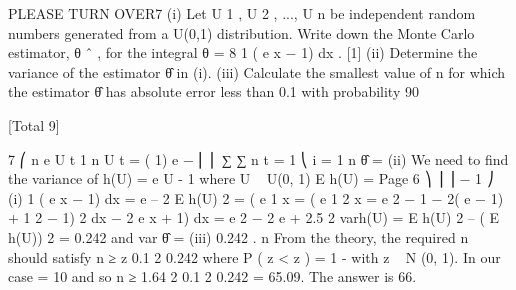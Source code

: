 \documentclass[a4paper,12pt]{article}
\begin{document}
PLEASE TURN OVER7
(i)
Let U 1 , U 2 , ..., U n be independent random numbers generated from a U(0,1)
distribution. Write down the Monte Carlo estimator, θ ˆ , for the integral
θ =
8
1
 ( e
x
− 1) dx .
[1]
(ii) Determine the variance of the estimator θ̂ in (i).
(iii) Calculate the smallest value of n for which the estimator θ̂ has absolute error
less than 0.1 with probability 90%

[Total 9]


7
⎛ n e U t
1 n U t
=
(
1)
e
−
⎜ ⎜ ∑
∑
n t = 1
⎝ i = 1 n
θ̂ =
(ii) We need to find the variance of h(U) = e U - 1 where U ~ U(0, 1)
E h(U) =
Page 6
⎞
⎟ ⎟ − 1
⎠
(i)
1
 ( e
x
− 1) dx = e – 2
E h(U) 2 =  ( e
1
x
=  ( e
1
2 x
= e 2 − 1
− 2( e − 1) + 1
2
− 1) 2 dx
− 2 e x + 1) dx%
=
e 2
− 2 e + 2.5
2
varh(U) = E h(U) 2 – ( E h(U)) 2 = 0.242 and var θ̂ =
(iii)
0.242
.
n
From the theory, the required n should satisfy
n ≥
z 
0.1 2
0.242
where P ( z < z \alpha  ) = 1 - \alpha  with z ~ N (0, 1). In our case \alpha  = 10%
and so
n ≥
1.64 2
0.1 2
0.242 = 65.09.
The answer is 66.
\end{document}
